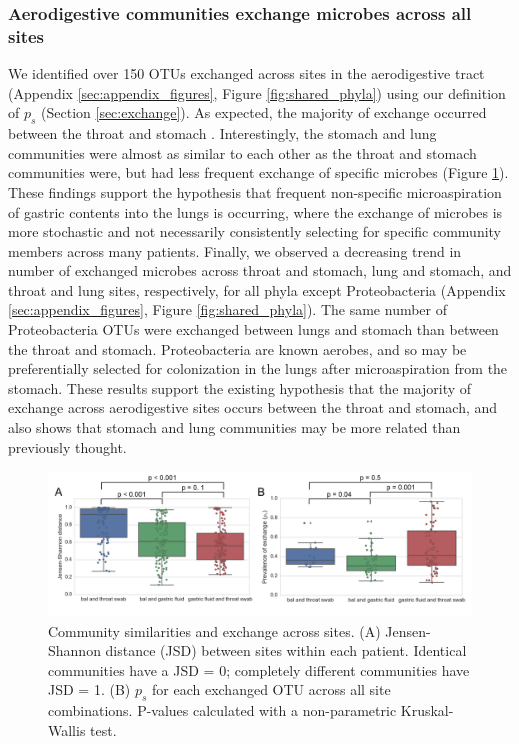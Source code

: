 \documentclass[12pt]{article}
\begin{document}
\subsubsection{Aerodigestive communities exchange microbes across all sites}

We identified over 150 OTUs exchanged across sites in the aerodigestive tract 
(Appendix \ref{sec:appendix_figures}, Figure \ref{fig:shared_phyla})
using our definition of $p_s$ (Section \ref{sec:exchange}).
As expected, the majority of exchange occurred between the throat and stomach \cite{bassis-source-2015}.
Interestingly, the stomach and lung communities were almost as similar to
each other as the throat and stomach communities were,
but had less frequent exchange of specific microbes (Figure \ref{fig:similarities}). 
These findings support the hypothesis that frequent non-specific microaspiration
of gastric contents into the lungs is occurring,
where the exchange of microbes is more stochastic and
not necessarily consistently selecting for specific community members across many patients.
Finally, we observed a decreasing trend in number of exchanged microbes 
across throat and stomach, lung and stomach, and throat and lung sites, respectively, 
for all phyla except Proteobacteria (Appendix \ref{sec:appendix_figures}, Figure \ref{fig:shared_phyla}). The same number of Proteobacteria OTUs were exchanged 
between lungs and stomach than between the throat and stomach. Proteobacteria are 
known aerobes, and so may be preferentially selected for colonization in 
the lungs after microaspiration from the stomach.
These results support the existing hypothesis that the majority of
exchange across aerodigestive sites occurs between the throat and stomach, and
also shows that stomach and lung communities may be more related than previously
thought.

\begin{figure}[h]
\begin{center}
	\includegraphics[scale=0.6]{all_jsd_sharedness}
	\caption{Community similarities and exchange across sites.
	(A) Jensen-Shannon distance (JSD) between sites within each patient. 
	Identical communities have a JSD = 0; completely different
	communities have JSD = 1. (B) $p_s$ for each exchanged OTU across 
	all site combinations. P-values calculated with a
	non-parametric Kruskal-Wallis test.}
	\label{fig:similarities}
\end{center}
\end{figure}
\end{document}
